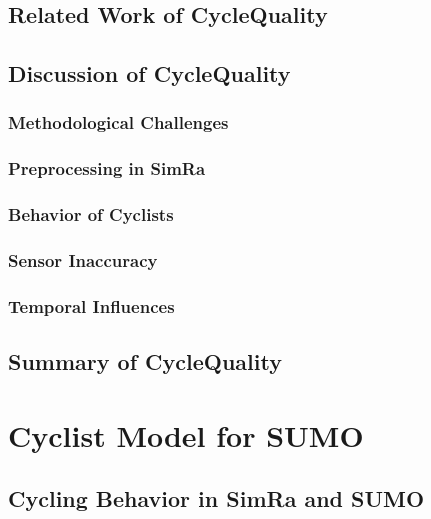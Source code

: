 \subsection{Related Work of CycleQuality}
\label{related_work_cyclequality}


\subsection{Discussion of CycleQuality}
\label{sec:discussion_cyclequality}


\subsubsection{Methodological Challenges}
\label{sec:methodological_challenges}

\subsubsection{Preprocessing in SimRa}
\label{sec:preprocessing_in_simra}

\subsubsection{Behavior of Cyclists}
\label{sec:behavior_of_cyclists}

\subsubsection{Sensor Inaccuracy}
\label{sec:sensor_inaccuracy}

\subsubsection{Temporal Influences}
\label{sec:temporal_influences}


\subsection{Summary of CycleQuality}
\label{sec:summary_cyclequality}



\section{Cyclist Model for SUMO}
\label{sec:sumo}



\subsection{Cycling Behavior in SimRa and SUMO}
\label{sec:cycling_behavior_in_simra_and_sumo}


